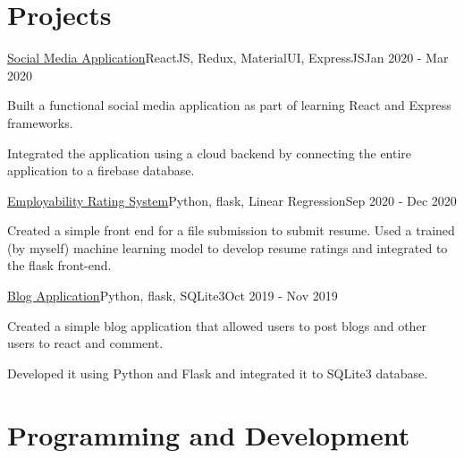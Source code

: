 \documentclass[letterpaper]{resume_config}
\begin{document}
\section{Projects}
\Project
    {\href{https://github.com/yk-2310/Social-app}{Social Media Application}}{ReactJS, Redux, MaterialUI, ExpressJS}{Jan 2020 - Mar 2020}
    {
        \item {Built a functional social media application as part of learning React and Express frameworks.}
        \item {Integrated the application using a cloud backend by connecting the entire application to a firebase database.}
    }
\Project
    {\href{https://github.com/yk-2310/Employability-Rating-System-using-Flask}{Employability Rating System}}{Python, flask, Linear Regression}{Sep 2020 - Dec 2020}
    {
        \item {Created a simple front end for a file submission to submit resume. Used a trained (by myself) machine learning model to develop resume ratings and integrated to the flask front-end.}
    }
\Project
    {\href{https://github.com/yk-2310/Blog-Application}{Blog Application}}{Python, flask, SQLite3}{Oct 2019 - Nov 2019}
    {
        \item {Created a simple blog application that allowed users to post blogs and other users to react and comment.}
        \item {Developed it using Python and Flask and integrated it to SQLite3 database.}
    }
\vspace{-10pt}
\section{Programming and Development}
\begin{URLList}[3][3]
    \item{}
    \item{}
    \item{}
    \item{}
    \item{}
    \item{}
\end{URLList}
\end{document}
